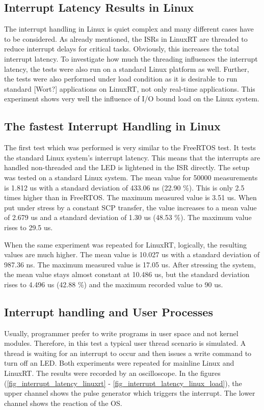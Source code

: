 \subsection{Interrupt Latency Results in Linux}\label{ss_interrupt_latency_results_in_linux}
The interrupt handling in Linux is quiet complex and many different cases have to be considered. 
As already mentioned, the \acp{ISR} in LinuxRT are threaded to reduce interrupt delays for critical tasks. 
Obviously, this increases the total interrupt latency.
To investigate how much the threading influences the interrupt latency, the tests were also run on a standard Linux platform as well.
Further, the tests were also performed under load condition as it is desirable to run standard [Wort?] applications on LinuxRT, not only real-time applications. 
This experiment shows very well the influence of \ac{I/O} bound load on the Linux system.

\subsection{The fastest Interrupt Handling in Linux}
The first test which was performed is very similar to the FreeRTOS test. 
It tests the standard Linux system's interrupt latency.
This means that the interrupts are handled non-threaded and the \ac{LED} is lightened in the \ac{ISR} directly.
The setup was tested on a standard Linux system.
The mean value for 50000 measurements is 1.812 us with a standard deviation of 433.06 ns (22.90 \%). 
This is only 2.5 times higher than in FreeRTOS. 
The maximum measured value is 3.51 us.
When put under stress by a constant SCP transfer, the value increases to a mean value of 2.679 us and a standard deviation of 1.30 us (48.53 \%).
The maximum value rises to 29.5 us.
\par
When the same experiment was repeated for LinuxRT, logically, the resulting values are much higher.
The mean value is 10.027 us with a standard deviation of 987.36 ns. 
The maximum measured value is 17.05 us.
After stressing the system, the mean value stays almost constant at 10.486 us, but the standard deviation rises to 4.496 us (42.88 \%) and the maximum recorded value to 90 us.

\subsection{Interrupt handling and User Processes}
Usually, programmer prefer to write programs in user space and not kernel modules. 
Therefore, in this test a typical user thread scenario is simulated.
A thread is waiting for an interrupt to occur and then issues a write command to turn off an \ac{LED}. 
Both experiments were repeated for mainline Linux and LinuxRT. 
The results were recorded by an oscilloscope.
In the figures (\ref{fig_interrupt_latency_linuxrt} - \ref{fig_interrupt_latency_linux_load}), the upper channel shows the pulse generator which triggers the interrupt.
The lower channel shows the reaction of the \ac{OS}.  


